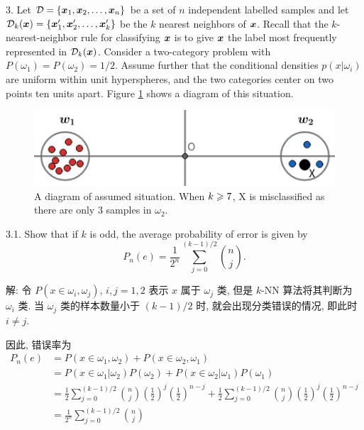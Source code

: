 \documentclass{article}
\begin{document}
3. Let $\mathcal{D}=\{\bm{x}_1,\bm{x}_2,\dots,\bm{x}_n\}$ be a set of $n$ independent labelled samples and let $\mathcal{D}_k(\bm{x})=\{\bm{x}'_1,\bm{x}'_2,\dots,\bm{x}'_k\}$ be the $k$ nearest neighbors of $\bm{x}$. Recall that the $k$-nearest-neighbor rule for classifying $\bm{x}$ is to give $\bm{x}$ the label most frequently represented in $\mathcal{D}_k(\bm{x})$. Consider a two-category problem with $P(\omega_1) = P(\omega_2) = 1/2$. Assume further that the conditional densities $p(x|\omega_i)$ are uniform within unit hyperspheres, and the two categories center on two points ten units apart. Figure \ref{pic2} shows a diagram of this situation.
\begin{figure}[ht]
	\centering
	\includegraphics[scale=0.5]{diagram.png}
	\caption{A diagram of assumed situation. When $k\geqslant7$, X is misclassified as there are only $3$ samples in $\omega_2$.}
	\label{pic2}
\end{figure}

3.1. Show that if $k$ is odd, the average probability of error is given by
\begin{equation}\nonumber
    P_n(e)=\frac{1}{2^n}\sum_{j=0}^{(k-1)/2}\binom{n}{j}.
\end{equation}

解: 令 $P(x\in\omega_i,\omega_j)$, $i,j=1,2$ 表示 $x$ 属于 $\omega_j$ 类, 但是 $k$-NN 算法将其判断为 $\omega_i$ 类. 当 $\omega_j$ 类的样本数量小于 $(k-1)/2$ 时, 就会出现分类错误的情况, 即此时 $i\neq j$.

因此, 错误率为
\begin{equation}
  \begin{aligned}
    P_n(e)
    &=P(x\in\omega_1,\omega_2)+P(x\in\omega_2,\omega_1)\\
    &=P(x\in\omega_1|\omega_2)P(\omega_2)+P(x\in\omega_2|\omega_1)P(\omega_1)\\
    &=\frac{1}{2}\sum_{j=0}^{(k-1)/2}\binom{n}{j}\left(\frac{1}{2}\right)^j\left(\frac{1}{2}\right)^{n-j}+\frac{1}{2}\sum_{j=0}^{(k-1)/2}\binom{n}{j}\left(\frac{1}{2}\right)^j\left(\frac{1}{2}\right)^{n-j}\\
    &=\frac{1}{2^n}\sum_{j=0}^{(k-1)/2}\binom{n}{j}
  \end{aligned}
\end{equation}
\end{document}
